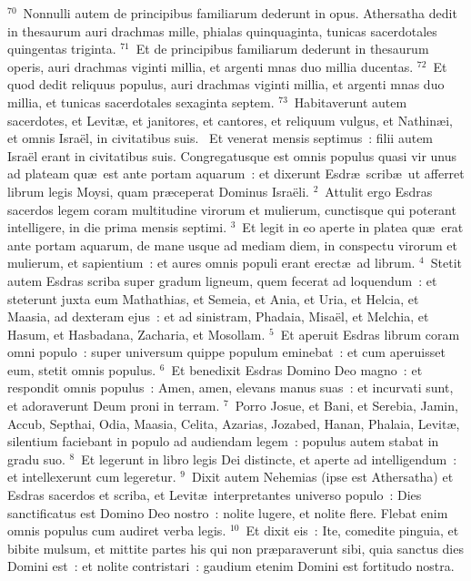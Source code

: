${}^{70}$~Nonnulli autem de principibus familiarum dederunt in opus. Athersatha dedit in thesaurum auri drachmas mille, phialas quinquaginta, tunicas sacerdotales quingentas triginta.
${}^{71}$~Et de principibus familiarum dederunt in thesaurum operis, auri drachmas viginti millia, et argenti mnas duo millia ducentas.
${}^{72}$~Et quod dedit reliquus populus, auri drachmas viginti millia, et argenti mnas duo millia, et tunicas sacerdotales sexaginta septem.
${}^{73}$~Habitaverunt autem sacerdotes, et Levit\ae , et janitores, et cantores, et reliquum vulgus, et Nathin\ae i, et omnis Isra\"el, in civitatibus suis.
~\lettrine[lines=10,image=true,loversize=0.05,lraise=-0.03]{E}{}t venerat mensis septimus~: filii autem Isra\"el erant in civitatibus suis. Congregatusque est omnis populus quasi vir unus ad plateam qu\ae\ est ante portam aquarum~: et dixerunt Esdr\ae\ scrib\ae\ ut afferret librum legis Moysi, quam pr\ae ceperat Dominus Isra\"eli.
${}^{2}$~Attulit ergo Esdras sacerdos legem coram multitudine virorum et mulierum, cunctisque qui poterant intelligere, in die prima mensis septimi.
${}^{3}$~Et legit in eo aperte in platea qu\ae\ erat ante portam aquarum, de mane usque ad mediam diem, in conspectu virorum et mulierum, et sapientium~: et aures omnis populi erant erect\ae\ ad librum.
${}^{4}$~Stetit autem Esdras scriba super gradum ligneum, quem fecerat ad loquendum~: et steterunt juxta eum Mathathias, et Semeia, et Ania, et Uria, et Helcia, et Maasia, ad dexteram ejus~: et ad sinistram, Phadaia, Misa\"el, et Melchia, et Hasum, et Hasbadana, Zacharia, et Mosollam.
${}^{5}$~Et aperuit Esdras librum coram omni populo~: super universum quippe populum eminebat~: et cum aperuisset eum, stetit omnis populus.
${}^{6}$~Et benedixit Esdras Domino Deo magno~: et respondit omnis populus~: Amen, amen, elevans manus suas~: et incurvati sunt, et adoraverunt Deum proni in terram.
${}^{7}$~Porro Josue, et Bani, et Serebia, Jamin, Accub, Septhai, Odia, Maasia, Celita, Azarias, Jozabed, Hanan, Phalaia, Levit\ae , silentium faciebant in populo ad audiendam legem~: populus autem stabat in gradu suo.
${}^{8}$~Et legerunt in libro legis Dei distincte, et aperte ad intelligendum~: et intellexerunt cum legeretur.
${}^{9}$~Dixit autem Nehemias (ipse est Athersatha) et Esdras sacerdos et scriba, et Levit\ae\ interpretantes universo populo~: Dies sanctificatus est Domino Deo nostro~: nolite lugere, et nolite flere. Flebat enim omnis populus cum audiret verba legis.
${}^{10}$~Et dixit eis~: Ite, comedite pinguia, et bibite mulsum, et mittite partes his qui non pr\ae paraverunt sibi, quia sanctus dies Domini est~: et nolite contristari~: gaudium etenim Domini est fortitudo nostra.
